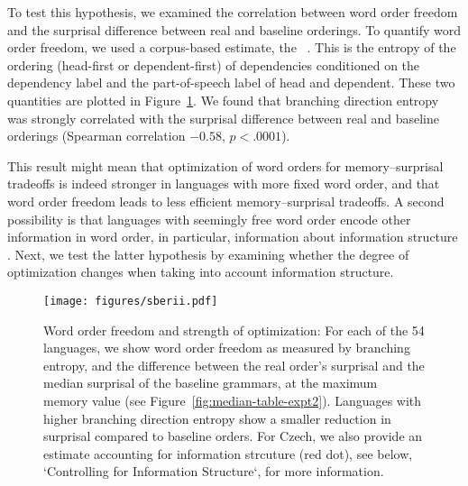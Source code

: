 To test this hypothesis, we examined the correlation between word order freedom and the surprisal difference between real and baseline orderings.
To quantify word order freedom, we used a corpus-based estimate, the ~\citep{futrell-quantifying-2015}.
This is the entropy of the ordering (head-first or dependent-first) of dependencies conditioned on the dependency label and the part-of-speech label of head and dependent.
These two quantities are plotted in Figure~\ref{fig:freedom-surp}.
We found that branching direction entropy was strongly correlated with the surprisal difference between real and baseline orderings (Spearman correlation $-0.58$, $p < .0001$).

This result might mean that optimization of word orders for memory--surprisal tradeoffs is indeed stronger in languages with more fixed word order, and that word order freedom leads to less efficient memory--surprisal tradeoffs.
A second possibility is that languages with seemingly free word order encode other information in word order, in particular, information about information structure \citep[e.g.][]{givon1988pragmatics,firbas1966defining,firbas1974aspects,myhill1985pragmatic}.
Next, we test the latter hypothesis by examining whether the degree of optimization changes when taking into account information structure.




\begin{figure}
\texttt{[image: figures/sberii.pdf]}
	\caption{Word order freedom and strength of optimization: For each of the 54 languages, we show word order freedom as measured by branching entropy, and the difference between the real order's surprisal and the median surprisal of the baseline grammars, at the maximum memory value (see Figure~\ref{fig:median-table-expt2}).
	Languages with higher branching direction entropy show a smaller reduction in surprisal compared to baseline orders.
	For Czech, we also provide an estimate accounting for information strcuture (red dot), see below, `Controlling for Information Structure`, for more information.
	}\label{fig:freedom-surp}
\end{figure}


